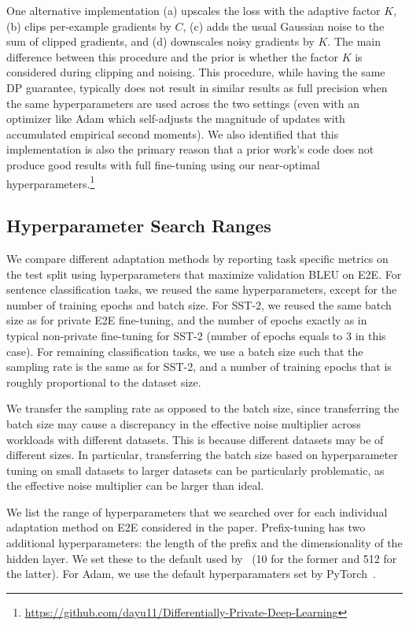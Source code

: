 One alternative implementation (a) upscales the loss with the adaptive factor $K$, (b) clips per-example gradients by $C$, (c) adds the usual Gaussian noise to the sum of clipped gradients, and (d) downscales noisy gradients by $K$. 
The main difference between this procedure and the prior is whether the factor $K$ is considered during clipping and noising.
This procedure, while having the same DP guarantee, typically does not result in similar results as full precision when the same hyperparameters are used across the two settings (even with an optimizer like Adam which self-adjusts the magnitude of updates with accumulated empirical second moments).
We also identified that this implementation is also the primary reason that a prior work's code does not produce good results with full fine-tuning using our near-optimal hyperparameters.\footnote{
    \url{https://github.com/dayu11/Differentially-Private-Deep-Learning}
}

\newpage
\subsection{Hyperparameter Search Ranges}\label{app:hp_search_range}
We compare different adaptation methods by reporting task specific metrics on the test split using hyperparameters that maximize validation BLEU on E2E.
For sentence classification tasks, we reused the same hyperparameters, except for the number of training epochs and batch size.
For SST-2, we reused the same batch size as for private E2E fine-tuning, and the number of epochs exactly as in typical non-private fine-tuning for SST-2 (number of epochs equals to 3 in this case).
For remaining classification tasks, we use a batch size such that the sampling rate is the same as for SST-2, and a number of training epochs that is roughly proportional to the dataset size.

We transfer the sampling rate as opposed to the batch size, since transferring the batch size may cause a discrepancy in the effective noise multiplier across workloads with different datasets.
This is because different datasets may be of different sizes.
In particular, transferring the batch size based on hyperparameter tuning on small datasets to larger datasets can be particularly problematic, as the effective noise multiplier can be larger than ideal. 

We list the range of hyperparameters that we searched over for each individual adaptation method on E2E considered in the paper. 
Prefix-tuning has two additional hyperparameters: the length of the prefix and the dimensionality of the hidden layer. 
We set these to the default used by~\cite{li2021prefix} (10 for the former and 512 for the latter).
For Adam, we use the default hyperparamaters set by PyTorch~\citep{paszke2017automatic}.

